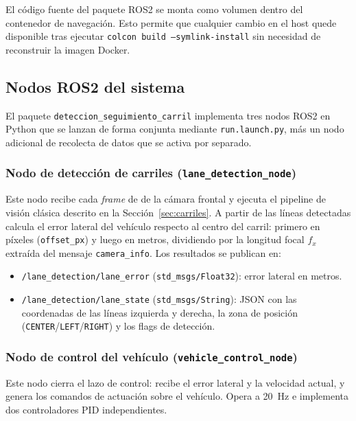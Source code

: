 \documentclass[12pt, a4paper]{article}
\begin{document}
El código fuente del paquete ROS2 se monta como volumen dentro del contenedor de navegación. Esto permite que cualquier cambio en el host quede disponible tras ejecutar \texttt{colcon build --symlink-install} sin necesidad de reconstruir la imagen Docker.

\subsection{Nodos ROS2 del sistema}

El paquete \texttt{deteccion\_seguimiento\_carril} implementa tres nodos ROS2 en Python que se lanzan de forma conjunta mediante \texttt{run.launch.py}, más un nodo adicional de recolecta de datos que se activa por separado.

\subsubsection{Nodo de detección de carriles (\texttt{lane\_detection\_node})}

Este nodo recibe cada \textit{frame} de de la cámara frontal y ejecuta el pipeline de visión clásica descrito en la Sección~\ref{sec:carriles}. A partir de las líneas detectadas calcula el error lateral del vehículo respecto al centro del carril: primero en píxeles (\texttt{offset\_px}) y luego en metros, dividiendo por la longitud focal $f_x$ extraída del mensaje \texttt{camera\_info}. Los resultados se publican en:
\begin{itemize}
    \item \texttt{/lane\_detection/lane\_error} (\texttt{std\_msgs/Float32}): error lateral en metros.
    \item \texttt{/lane\_detection/lane\_state} (\texttt{std\_msgs/String}): JSON con las coordenadas de las líneas izquierda y derecha, la zona de posición (\texttt{CENTER}/\texttt{LEFT}/\texttt{RIGHT}) y los flags de detección.
\end{itemize}

\subsubsection{Nodo de control del vehículo (\texttt{vehicle\_control\_node})}

Este nodo cierra el lazo de control: recibe el error lateral y la velocidad actual, y genera los comandos de actuación sobre el vehículo. Opera a 20~Hz e implementa dos controladores PID independientes.
\end{document}
